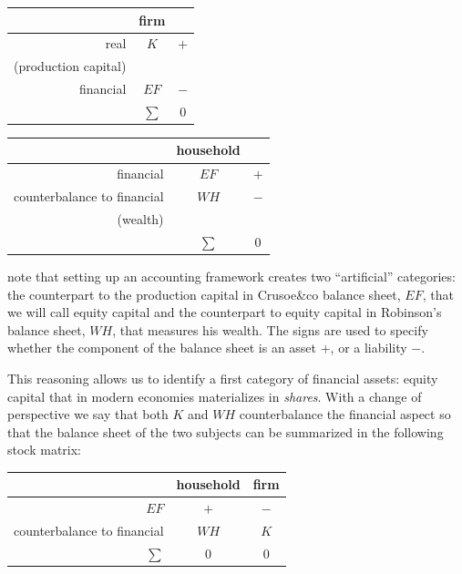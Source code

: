 \documentclass{article}
\begin{document}
\vskip5mm
\begin{center}

\begin{tabular}{r c c}
	& \parbox{1.5cm}{\centerline{firm}} & \\
\hline
real	&$K$	& $+$	\\
(production capital)&		&	\\
\hline
financial&$EF$	&$-$	\\
\hline
&$\sum$		&0\\
\end{tabular}


\hskip1cm
\begin{tabular}{r c c }
	
	&household&\\
\hline
financial&$EF$	&	$+$  \\
\hline
counterbalance to financial &$WH$	&$-$\\
(wealth) &	&\\
\hline
&$\sum$	&	0
\end{tabular}


\end{center}
\vskip5mm
note that setting up an accounting framework creates two ``artificial'' categories: the counterpart to the production capital in Crusoe\&co balance sheet, $EF$, that we will call equity capital and the counterpart to equity capital in Robinson's balance sheet, $WH$, that measures his wealth. The signs are used to specify whether the component of the balance sheet is an asset $+$, or a liability $-$.

This reasoning allows us to identify a first category of financial assets: equity capital that %
in modern economies materializes in \textit{shares}.
With a change of perspective we say that both $K$ and $WH$ counterbalance the financial aspect so that the balance sheet of the two subjects can be summarized in the following stock matrix:

\vskip5mm
\begin{center}

\begin{tabular}{r c c}
	\hline
	& household 	& \parbox{1.5cm}{\centerline{firm}} \\
\hline
\hline
$EF$	&	$+$	&$-$	\\
	\hline
counterbalance to financial	&	$WH$	&$K$	\\
\hline
\hline
$\sum$		&0&0\\
\end{tabular}
\end{center}
\vskip5mm
\end{document}
